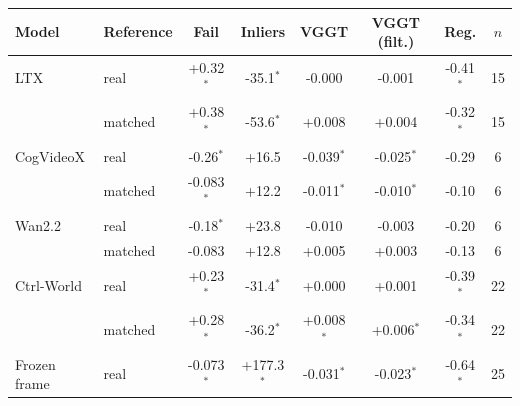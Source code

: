 \begin{tabular}{llcccccc}
\toprule
Model & Reference & Fail & Inliers & VGGT & VGGT (filt.) & Reg. & $n$ \\
\midrule
LTX & real & +0.32$^*$ & -35.1$^*$ & -0.000 & -0.001 & -0.41$^*$ & 15 \\
 & matched & +0.38$^*$ & -53.6$^*$ & +0.008 & +0.004 & -0.32$^*$ & 15 \\
CogVideoX & real & -0.26$^*$ & +16.5 & -0.039$^*$ & -0.025$^*$ & -0.29 & 6 \\
 & matched & -0.083$^*$ & +12.2 & -0.011$^*$ & -0.010$^*$ & -0.10 & 6 \\
Wan2.2 & real & -0.18$^*$ & +23.8 & -0.010 & -0.003 & -0.20 & 6 \\
 & matched & -0.083 & +12.8 & +0.005 & +0.003 & -0.13 & 6 \\
Ctrl-World & real & +0.23$^*$ & -31.4$^*$ & +0.000 & +0.001 & -0.39$^*$ & 22 \\
 & matched & +0.28$^*$ & -36.2$^*$ & +0.008$^*$ & +0.006$^*$ & -0.34$^*$ & 22 \\
\midrule
Frozen frame & real & -0.073$^*$ & +177.3$^*$ & -0.031$^*$ & -0.023$^*$ & -0.64$^*$ & 25 \\
\bottomrule
\end{tabular}